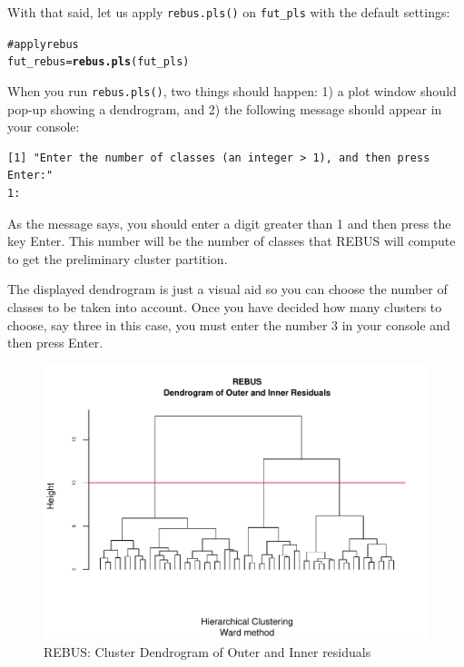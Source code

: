 \documentclass[12pt]{book}\usepackage{graphicx, color}
\makeatletter
\newcommand{\hlfunctioncall}[1]{\textcolor[rgb]{0.501960784313725,0,0.329411764705882}{\textbf{#1}}}%
\newcommand{\hlcomment}[1]{\textcolor[rgb]{0.180392156862745,0.6,0.341176470588235}{#1}}%
\newenvironment{kframe}{%
 \def\at@end@of@kframe{}%
 \ifinner\ifhmode%
  \def\at@end@of@kframe{\end{minipage}}%
  \begin{minipage}{\columnwidth}%
 \fi\fi%
 \def\FrameCommand##1{\hskip\@totalleftmargin \hskip-\fboxsep
 \colorbox{shadecolor}{##1}\hskip-\fboxsep
     \hskip-\linewidth \hskip-\@totalleftmargin \hskip\columnwidth}%
 \MakeFramed {\advance\hsize-\width
   \@totalleftmargin\z@ \linewidth\hsize
   \@setminipage}}%
 {\par\unskip\endMakeFramed%
 \at@end@of@kframe}
\newenvironment{knitrout}{}{} %
\newcommand{\code}[1]{\texttt{#1}}
\makeatother
\begin{document}
With that said, let us apply \code{rebus.pls()} on \code{fut\_pls} with the default settings:
\begin{knitrout}
\color{fgcolor}\begin{kframe}
\begin{alltt}
\hlcomment{# apply rebus}
fut_rebus = \hlfunctioncall{rebus.pls}(fut_pls)
\end{alltt}
\end{kframe}
\end{knitrout}

When you run \texttt{rebus.pls()}, two things should happen: 1) a plot window should pop-up showing a dendrogram, and 2) the following message should appear in your console: \\
\begin{verbatim}
[1] "Enter the number of classes (an integer > 1), and then press Enter:"
1: 
\end{verbatim}

\vspace{3mm}
As the message says, you should enter a digit greater than 1 and then press the key Enter. This number will be the number of classes that REBUS will compute to get the preliminary cluster partition.

The displayed dendrogram is just a visual aid so you can choose the number of classes to be taken into account. Once you have decided how many clusters to choose, say three in this case, you must enter the number 3 in your console and then press Enter.

\begin{knitrout}
\color{fgcolor}\begin{figure}[h]


{\centering \includegraphics[width=0.95\linewidth,height=.65\linewidth]{figure/fut_pls_rebus} 

}

\caption[REBUS]{REBUS: Cluster Dendrogram of Outer and Inner residuals\label{fig:fut_pls_rebus}}
\end{figure}


\end{knitrout}
\end{document}
